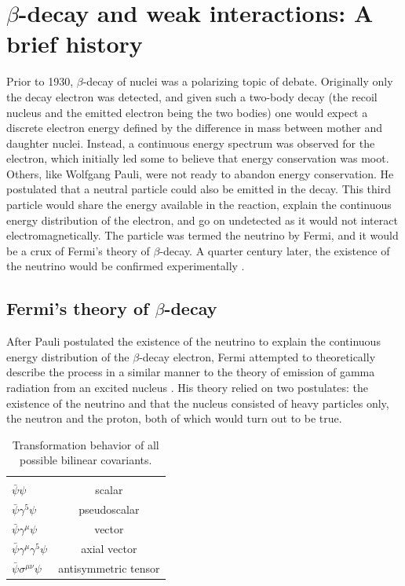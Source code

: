 \section{$\beta$-decay and weak interactions: A brief history}

Prior to 1930, $\beta$-decay of nuclei was a polarizing topic of debate. Originally
only the decay electron was detected, and given such a two-body decay (the recoil
nucleus and the emitted electron being the two bodies) one would expect a discrete
electron energy defined by the difference in mass between mother and daughter
nuclei. Instead, a continuous energy spectrum was observed for the electron, which
initially led some to believe that energy conservation was moot. Others, like
Wolfgang Pauli, were not ready
to abandon energy conservation. He postulated that a neutral particle
could also be emitted in the decay. This third particle would share the energy available
in the reaction, explain the continuous energy distribution of the electron, and go
on undetected as it would not interact electromagnetically. The particle was termed
the neutrino by Fermi, and it would be a crux of Fermi's theory of $\beta$-decay.
A quarter century later, the existence of the neutrino would be confirmed
experimentally \cite{cowan1956detection}.

\subsection{Fermi's theory of $\beta$-decay}
After Pauli postulated the existence of the neutrino to explain the continuous energy
distribution of the $\beta$-decay electron, Fermi attempted to theoretically describe
the process in a similar manner to the theory of emission of
gamma radiation from an excited nucleus \cite{fermi1934,wilson1968fermi}.
His theory relied on two postulates: the existence of the neutrino and that the nucleus consisted
of heavy particles only, the neutron and the proton, both of which would turn out to be true.

\begin{table}[h]
  \caption{Transformation behavior of all possible bilinear covariants.} 
  \centering
  \begin{tabular}{l c }
    \hline \hline \\ [-1.75ex]
    $\bar{\psi}\psi$ & scalar \\ [0.50ex]
    $\bar{\psi}\gamma^5\psi$ & pseudoscalar \\ [0.50ex]
    $\bar{\psi}\gamma^{\mu}\psi$ & vector \\ [0.50ex]
    $\bar{\psi}\gamma^{\mu}\gamma^5\psi$ & axial vector \\ [0.50ex]
    $\bar{\psi}\sigma^{\mu\nu}\psi$ & antisymmetric tensor \\ [0.50ex]   
    \hline
  \end{tabular}
  \label{tab:bilinearCov}
\end{table}

